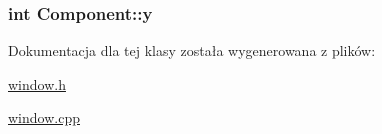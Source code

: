 \subsubsection[{\texorpdfstring{y}{y}}]{\setlength{\rightskip}{0pt plus 5cm}int Component\+::y\hspace{0.3cm}{\ttfamily [private]}}\hypertarget{classComponent_a3cbb2a0f076a05810ad64ac22ea10402}{}\label{classComponent_a3cbb2a0f076a05810ad64ac22ea10402}


Dokumentacja dla tej klasy została wygenerowana z plików\+:\begin{DoxyCompactItemize}
\item 
\hyperlink{window_8h}{window.\+h}\item 
\hyperlink{window_8cpp}{window.\+cpp}\end{DoxyCompactItemize}

